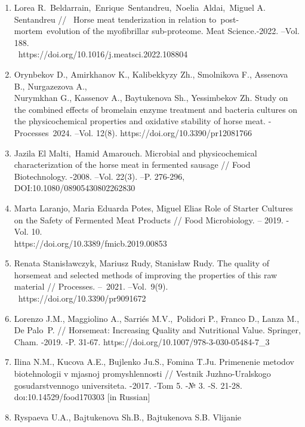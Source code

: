\begin{noparindent}

\begin{enumerate}
\def\labelenumi{\arabic{enumi}.}
\item
  Lorea R.~Beldarrain,~Enrique~Sentandreu,~Noelia~Aldai,~Miguel A.
  Sentandreu //~ Horse meat tenderization in relation
  to~post-mortem~evolution of the myofibrillar sub-proteome. Meat
  Science.-2022. --Vol.
  188.\\~https://doi.org/10.1016/j.meatsci.2022.108804
\item
  Orynbekov D., Amirkhanov K., Kalibekkyzy Zh., Smolnikova F., Assenova
  B., Nurgazezova A., \\Nurymkhan G., Kassenov A., Baytukenova Sh.,
  Yessimbekov Zh. Study on the combined effects of bromelain enzyme
  treatment and bacteria cultures on the physicochemical properties and
  oxidative stability of horse meat. -Processes\emph{~}2024. --Vol.
  12(8). https://doi.org/10.3390/pr12081766
\item
  Jazila El Malti,~Hamid Amarouch. Microbial and physicochemical
  characterization of the horse meat in fermented sausage // Food
  Biotechnology. -2008. --Vol. 22(3). --P. 276-296, \\DOI:10.1080/08905430802262830
\item
  Marta Laranjo, Maria Eduarda Potes, Miguel Elias Role of Starter
  Cultures on the Safety of Fermented Meat Products // Food
  Microbiology. -- 2019. -Vol. 10.\\ https://doi.org/10.3389/fmicb.2019.00853
\item
  Renata Stanisławczyk, Mariusz Rudy, Stanisław Rudy. The quality of
  horsemeat and selected methods of improving the properties of this raw
  material // Processes. --~2021. --Vol.~9(9).\\ ~https://doi.org/10.3390/pr9091672
\item
  Lorenzo J.M., Maggiolino A., Sarriés M.V.,~Polidori P., Franco D.,
  Lanza M., De Palo~P. // Horsemeat: Increasing Quality and Nutritional
  Value. Springer, Cham. -2019. -P. 31-67.
  https://doi.org/10.1007/978-3-030-05484-7\_3
\item
  Il\textquotesingle ina N.M., Kucova A.E., Bujlenko Ju.S., Fomina T.Ju.
  Primenenie metodov biotehnologii v mjasnoj promyshlennosti // Vestnik
  Juzhno-Ural\textquotesingle skogo gosudarstvennogo universiteta.
  -2017. -Tom 5. -№ 3. -S. 21-28. doı:10.14529/food170303 {[}in
  Russian{]}
\item
  Ryspaeva U.A., Bajtukenova Sh.B., Bajtukenova S.B. Vlijanie

\end{enumerate}
\end{noparindent}
